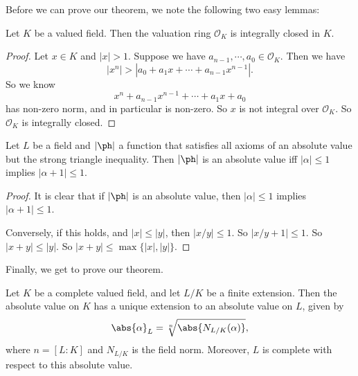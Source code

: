 \documentclass[a4paper]{article}
\begin{document}
Before we can prove our theorem, we note the following two easy lemmas:
\begin{lemma}
  Let $K$ be a valued field. Then the valuation ring $\mathcal{O}_K$ is integrally closed in $K$.
\end{lemma}

\begin{proof}
  Let $x \in K$ and $|x| > 1$. Suppose we have $a_{n - 1}, \cdots, a_0 \in \mathcal{O}_K$. Then we have
  \[
    |x^n| > |a_0 + a_1x + \cdots + a_{n - 1} x^{n - 1}|.
  \]
  So we know
  \[
    x^n + a_{n - 1}x^{n - 1} + \cdots + a_1 x + a_0
  \]
  has non-zero norm, and in particular is non-zero. So $x$ is not integral over $\mathcal{O}_K$. So $\mathcal{O}_K$ is integrally closed.
\end{proof}

\begin{lemma}
  Let $L$ be a field and $|\ph|$ a function that satisfies all axioms of an absolute value but the strong triangle inequality. Then $|\ph|$ is an absolute value iff $|\alpha| \leq 1$ implies $|\alpha + 1| \leq 1$.
\end{lemma}

\begin{proof}
  It is clear that if $|\ph|$ is an absolute value, then $|\alpha| \leq 1$ implies $|\alpha + 1| \leq 1$.

  Conversely, if this holds, and $|x| \leq |y|$, then $|x/y| \leq 1$. So $|x/y + 1| \leq 1$. So $|x + y| \leq |y|$. So $|x + y| \leq \max\{|x|, |y|\}$.
\end{proof}

Finally, we get to prove our theorem.
\begin{thm}
  Let $K$ be a complete valued field, and let $L/K$ be a finite extension. Then the absolute value on $K$ has a unique extension to an absolute value on $L$, given by
  \[
    \abs{\alpha}_L = \sqrt[n]{\abs{N_{L/K}(\alpha)}},
  \]
  where $n = [L:K]$ and $N_{L/K}$ is the field norm. Moreover, $L$ is complete with respect to this absolute value.
\end{thm}
\end{document}
